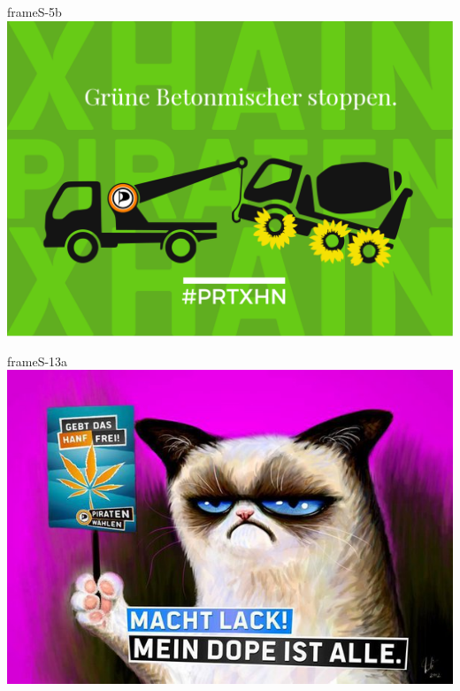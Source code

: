 \documentclass[a4paper,10pt]{article}
\begin{document}
\begin{staticcontents*}{frameS-5b}
\hspace*{-4.5cm}
\vspace*{2cm}
\includegraphics[width=\paperwidth]{images/blog/large/gruenebetonmischer.png}
\vspace*{1cm}
\end{staticcontents*}



\begin{staticcontents*}{frameS-13a}
\includegraphics[viewport = {0cm 0cm 21cm 16cm}, clip]{images/blog/large/machtlack.jpg}
\end{staticcontents*}

\end{document}
